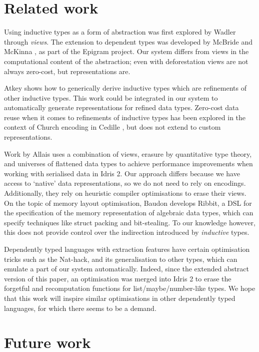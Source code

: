 \section{Related work}

Using inductive types as a form of abstraction was first explored by Wadler
\cite{Wadler1987-zp} through \emph{views}. The extension to dependent types
was developed by McBride and McKinna \cite{Mcbride2004-fd}, as part of the
Epigram project. Our system differs from views in the computational content
of the abstraction; even with deforestation \cite{Wadler1990-yo} views are not
always zero-cost, but representations are.

Atkey \cite{Atkey2011-ex} shows how to generically derive inductive types which
are refinements of other inductive types. This work could be integrated in our
system to automatically generate representations for refined data types.
Zero-cost data reuse when it comes to refinements of inductive types has been
explored in the context of Church encoding in Cedille \cite{Diehl2018-ba}, but
does not extend to custom representations.

Work by Allais \cite{Allais2023-pf,Allais2023-zq} uses a combination of views,
erasure by quantitative type theory, and universes of flattened data types to
achieve performance improvements when working with serialised data in Idris 2.
Our approach differs because we have access to `native' data representations, so
we do not need to rely on encodings. Additionally, they rely on heuristic compiler
optimisations to erase their views.
On the topic of memory layout optimisation, Baudon \cite{Baudon2023-cy} develops
Ribbit, a DSL for the specification of the memory representation of algebraic
data types, which can specify techniques like struct packing and bit-stealing.
To our knowledge however, this does not provide control over the indirection
introduced by \emph{inductive} types.

Dependently typed languages with extraction features have certain optimisation
tricks such as the Nat-hack, and its generalisation to other types, which can
emulate a part of our system automatically. Indeed, since the extended abstract
version of this paper, an optimisation was merged into Idris 2 to erase the
forgetful and recomputation functions for list/maybe/number-like types. We hope
that this work will inspire similar optimisations in other dependently typed
languages, for which there seems to be a demand.

\section{Future work}

